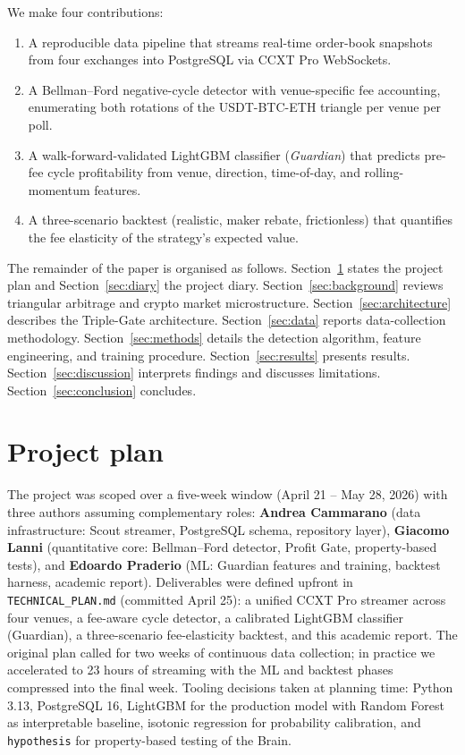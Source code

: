 \documentclass[11pt,a4paper]{article}
\begin{document}
We make four contributions:
\begin{enumerate}[label=(\roman*)]
    \item A reproducible data pipeline that streams real-time order-book snapshots from four exchanges into PostgreSQL via CCXT Pro WebSockets.
    \item A Bellman--Ford negative-cycle detector with venue-specific fee accounting, enumerating both rotations of the USDT-BTC-ETH triangle per venue per poll.
    \item A walk-forward-validated LightGBM classifier (\emph{Guardian}) that predicts pre-fee cycle profitability from venue, direction, time-of-day, and rolling-momentum features.
    \item A three-scenario backtest (realistic, maker rebate, frictionless) that quantifies the fee elasticity of the strategy's expected value.
\end{enumerate}

The remainder of the paper is organised as follows. Section~\ref{sec:plan} states the project plan and Section~\ref{sec:diary} the project diary. Section~\ref{sec:background} reviews triangular arbitrage and crypto market microstructure. Section~\ref{sec:architecture} describes the Triple-Gate architecture. Section~\ref{sec:data} reports data-collection methodology. Section~\ref{sec:methods} details the detection algorithm, feature engineering, and training procedure. Section~\ref{sec:results} presents results. Section~\ref{sec:discussion} interprets findings and discusses limitations. Section~\ref{sec:conclusion} concludes.

\section{Project plan}
\label{sec:plan}

The project was scoped over a five-week window (April 21 -- May 28, 2026) with three authors assuming complementary roles: \textbf{Andrea Cammarano} (data infrastructure: Scout streamer, PostgreSQL schema, repository layer), \textbf{Giacomo Lanni} (quantitative core: Bellman--Ford detector, Profit Gate, property-based tests), and \textbf{Edoardo Praderio} (ML: Guardian features and training, backtest harness, academic report). Deliverables were defined upfront in \texttt{TECHNICAL\_PLAN.md} (committed April 25): a unified CCXT Pro streamer across four venues, a fee-aware cycle detector, a calibrated LightGBM classifier (Guardian), a three-scenario fee-elasticity backtest, and this academic report. The original plan called for two weeks of continuous data collection; in practice we accelerated to 23 hours of streaming with the ML and backtest phases compressed into the final week. Tooling decisions taken at planning time: Python 3.13, PostgreSQL 16, LightGBM for the production model with Random Forest as interpretable baseline, isotonic regression for probability calibration, and \texttt{hypothesis} for property-based testing of the Brain.
\end{document}
